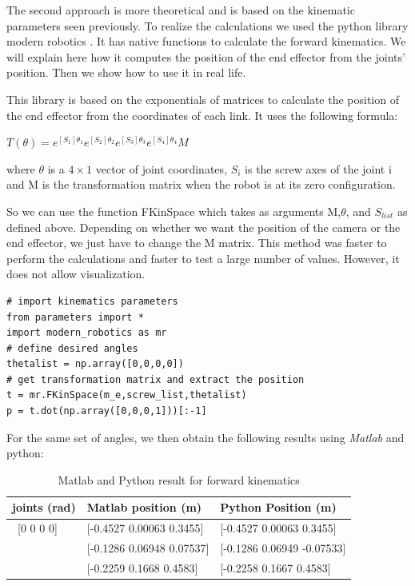 \bigbreak
The second approach is more theoretical and is based on the kinematic parameters seen previously. To realize the calculations we used the python library modern robotics \cite{Mordern_Robotic}. It has native functions to calculate the forward kinematics. We will explain here how it computes the position of the end effector from the joints' position. Then we show how to use it in real life.

\bigbreak
This library is based on the exponentials of matrices to calculate the position of the end effector from the coordinates of each link. It uses the following formula: 

\begin{center}
    $T(\theta) = e^{[S_1]\theta_1}e^{[S_2]\theta_2}e^{[S_3]\theta_3}e^{[S_4]\theta_4}M$    
\end{center}
where $\theta$ is a $4\times1$ vector of joint coordinates, $S_i$ is the screw axes of the joint i and M is the transformation matrix when the robot is at its zero configuration.


\bigbreak
So we can use the function FKinSpace which takes as arguments M,$\theta$, and $S_{list}$ as defined above. Depending on whether we want the position of the camera or the end effector, we just have to change the M matrix. This method was faster to perform the calculations and faster to test a large number of values. However, it does not allow visualization.

\begin{verbatim}
# import kinematics parameters
from parameters import * 
import modern_robotics as mr
# define desired angles 
thetalist = np.array([0,0,0,0])
# get transformation matrix and extract the position
t = mr.FKinSpace(m_e,screw_list,thetalist)
p = t.dot(np.array([0,0,0,1]))[:-1]
\end{verbatim}

\bigbreak
For the same set of angles, we then obtain the following results using \textit{Matlab} and python: 
\begin{table}[ht]
    \centering
    \begin{tabular}{|p{4cm} | p{4.5cm} | p{4.5cm}|} 
        \hline
        \textbf{joints (rad)} & \textbf{Matlab position (m)} & \textbf{Python Position (m)}\\ [0.3ex] 
        \hline\
        [0 0 0 0] & [-0.4527 0.00063 0.3455] & [-0.4527 0.00063 0.3455] \\ 
        \hline
        [pi/4,-pi/3,0,pi/3] & [-0.1286 0.06948 0.07537] & [-0.1286  0.06949 -0.07533] \\ 
        \hline
        [pi/4,pi/6,-pi/6,pi/3]& [-0.2259 0.1668 0.4583] & [-0.2258  0.1667  0.4583] \\ 
        \hline
    \end{tabular}
    \caption{Matlab and Python result for forward kinematics}
\end{table}

